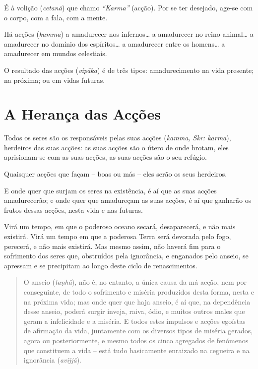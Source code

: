 É à volição (\emph{cetanā}) que chamo \emph{``Karma''} (acção). Por se ter
desejado, age-se com o corpo, com a fala, com a mente.

Há acções (\emph{kamma}) a amadurecer nos infernos\ldots{} a amadurecer no reino
animal\ldots{} a amadurecer no domínio dos espíritos\ldots{} a amadurecer entre
os homens\ldots{} a amadurecer em mundos celestiais.

O resultado das acções (\emph{vipāka}) é de três tipos: amadurecimento na vida
presente; na próxima; ou em vidas futuras.


\section{A Herança das Acções}

Todos os seres são os responsáveis pelas suas acções (\emph{kamma, Skr: karma}),
herdeiros das suas acções: as suas acções são o útero de onde brotam, eles
aprisionam-se com as suas acções, as suas acções são o seu refúgio.

Quaisquer acções que façam -- boas ou más -- eles serão os seus herdeiros.


E onde quer que surjam os seres na existência, é aí que as suas acções
amadurecerão; e onde quer que amadureçam as suas acções, é aí que ganharão os
frutos dessas acções, nesta vida e nas futuras.


Virá um tempo, em que o poderoso oceano secará, desaparecerá, e não mais
existirá. Virá um tempo em que a poderosa Terra será devorada pelo fogo,
perecerá, e não mais existirá. Mas mesmo assim, não haverá fim para o sofrimento
dos seres que, obstruídos pela ignorância, e enganados pelo anseio, se apressam
e se precipitam ao longo deste ciclo de renascimentos.


\begin{quote}
  O anseio (\emph{ta\d{n}hā}), não é, no entanto, a única causa da má acção, nem por
  conseguinte, de todo o sofrimento e miséria produzidos desta forma, nesta e na
  próxima vida; mas onde quer que haja anseio, é aí que, na dependência desse
  anseio, poderá surgir inveja, raiva, ódio, e muitos outros males que geram a
  infelicidade e a miséria. E todos estes impulsos e acções egoístas de
  afirmação da vida, juntamente com os diversos tipos de miséria gerados, agora
  ou posteriormente, e mesmo todos os cinco agregados de fenómenos que
  constituem a vida -- está tudo basicamente enraizado na cegueira e na
  ignorância (\emph{avijjā}).
\end{quote}


